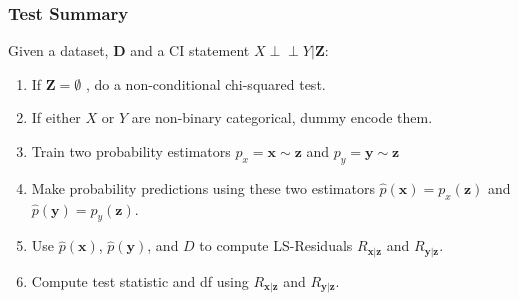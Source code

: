 \documentclass{beamer}
\def\ci{\perp\!\!\!\!\!\perp}
\begin{document}
\begin{frame}
	\frametitle{Test Summary}
	Given a dataset, $ \mathbf{D} $ and a CI statement $ X \ci Y | \bm{Z} $:
	\begin{enumerate}
		\setlength\itemsep{1em}
		\item If $\mathbf{Z} = \emptyset $ , do a non-conditional chi-squared test.
		\item If either $ X $ or $ Y $ are non-binary categorical,
			dummy encode them.
		\item Train two probability estimators $ p_x = \bm{x} \sim \bm{z} $ and
			$ p_y = \bm{y} \sim \bm{z} $
		\item Make probability predictions using these two estimators 
			$ \hat{p}(\bm{x}) = p_x(\bm{z}) $ and $ \hat{p}(\bm{y}) = p_y(\bm{\bm{z}}) $.
		\item Use $ \hat{p}(\bm{x}) $, $ \hat{p}(\bm{y}) $, and $ D $ to compute LS-Residuals $ R_{\bm{x}|\bm{z}} $ and $ R_{\bm{y}|\bm{z}} $.	
		\item Compute test statistic and df using $ R_{\bm{x}|\bm{z}} $ and $ R_{\bm{y}|\bm{z}} $.
	\end{enumerate}
\end{frame}
% 
% 
% 
\end{document}
